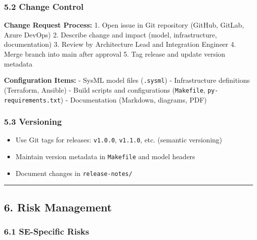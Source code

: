 \documentclass[12pt]{article}
\providecommand{\tightlist}{%
  \setlength{\itemsep}{0pt}\setlength{\parskip}{0pt}}
\begin{document}
\subsubsection{5.2 Change Control}\label{change-control}

\textbf{Change Request Process:} 1. Open issue in Git repository
(GitHub, GitLab, Azure DevOps) 2. Describe change and impact (model,
infrastructure, documentation) 3. Review by Architecture Lead and
Integration Engineer 4. Merge branch into main after approval 5. Tag
release and update version metadata

\textbf{Configuration Items:} - SysML model files (\texttt{.sysml}) -
Infrastructure definitions (Terraform, Ansible) - Build scripts and
configurations (\texttt{Makefile}, \texttt{py-requirements.txt}) -
Documentation (Markdown, diagrams, PDF)

\subsubsection{5.3 Versioning}\label{versioning}

\begin{itemize}
\tightlist
\item
  Use Git tags for releases: \texttt{v1.0.0}, \texttt{v1.1.0}, etc.
  (semantic versioning)
\item
  Maintain version metadata in \texttt{Makefile} and model headers
\item
  Document changes in \texttt{release-notes/}
\end{itemize}

\begin{center}\rule{0.5\linewidth}{0.5pt}\end{center}

\subsection{6. Risk Management}\label{risk-management}

\subsubsection{6.1 SE-Specific Risks}\label{se-specific-risks}
\end{document}
